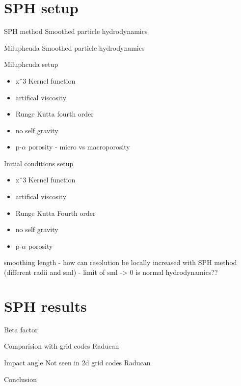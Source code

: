 \documentclass{beamer}
\begin{document}
\section{SPH setup}
\begin{frame}{SPH method}
	Smoothed particle hydrodynamics
\end{frame}
\begin{frame}{Miluphcuda}
	Smoothed particle hydrodynamics
\end{frame}
\begin{frame}{Miluphcuda setup}
	\begin{itemize}
		\item xˆ3 Kernel function \pause
		\item artifical viscosity \pause
		\item Runge Kutta fourth order \pause
		\item no self gravity \pause
		\item p-$\alpha$ porosity - micro vs macroporosity\pause
	\end{itemize}
\end{frame}
\begin{frame}{Initial conditions setup}
	\begin{itemize}
		\item xˆ3 Kernel function \pause
		\item artifical viscosity \pause
		\item Runge Kutta Fourth order \pause
		\item no self gravity \pause
		\item p-$\alpha$ porosity \pause
	\end{itemize}
\end{frame}
\begin{frame}{smoothing length}
	- how can resolution be locally increased with SPH method (different radii and sml)
	- limit of sml -> 0 is normal hydrodynamics??
\end{frame}
\section{SPH results}
\begin{frame}{Beta factor}
\end{frame}
\begin{frame}{Comparision with grid codes}
	Raducan
\end{frame}

\begin{frame}{Impact angle}
	Not seen in 2d grid codes Raducan
\end{frame}
\begin{frame}{Conclusion}
\end{frame}
\end{document}

